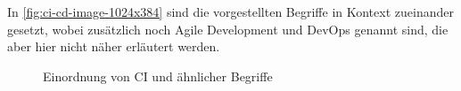 In \autoref{fig:ci-cd-image-1024x384} sind die vorgestellten Begriffe in Kontext zueinander gesetzt, wobei zusätzlich noch Agile Development und DevOps genannt sind, die aber hier nicht näher erläutert werden.

\begin{figure}[h]
  \centering
  \caption{Einordnung von CI und ähnlicher Begriffe \cite{Begriff-Overview}}\label{fig:ci-cd-image-1024x384}
\end{figure}

